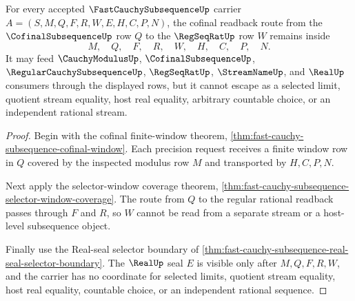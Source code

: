 \begin{theorem}
\label{thm:fast-cauchy-subsequence-cofinal-readback-nonescape}
For every accepted $\FastCauchySubsequenceUp$ carrier $A=(S,M,Q,F,R,W,E,H,C,P,N)$, the cofinal readback route from the $\CofinalSubsequenceUp$ row $Q$ to the $\RegSeqRatUp$ row $W$ remains inside
$$
M,\quad Q,\quad F,\quad R,\quad W,\quad H,\quad C,\quad P,\quad N.
$$
It may feed $\CauchyModulusUp$, $\CofinalSubsequenceUp$, $\RegularCauchySubsequenceUp$, $\RegSeqRatUp$, $\StreamNameUp$, and $\RealUp$ consumers through the displayed rows, but it cannot escape as a selected limit, quotient stream equality, host real equality, arbitrary countable choice, or an independent rational stream.
\end{theorem}
\begin{proof}
Begin with the cofinal finite-window theorem, \autoref{thm:fast-cauchy-subsequence-cofinal-window}. Each precision request receives a finite window row in $Q$ covered by the inspected modulus row $M$ and transported by $H,C,P,N$.

Next apply the selector-window coverage theorem, \autoref{thm:fast-cauchy-subsequence-selector-window-coverage}. The route from $Q$ to the regular rational readback passes through $F$ and $R$, so $W$ cannot be read from a separate stream or a host-level subsequence object.

Finally use the Real-seal selector boundary of \autoref{thm:fast-cauchy-subsequence-real-seal-selector-boundary}. The $\RealUp$ seal $E$ is visible only after $M,Q,F,R,W$, and the carrier has no coordinate for selected limits, quotient stream equality, host real equality, countable choice, or an independent rational sequence.
\end{proof}

